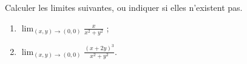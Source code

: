 \begin{exercice}[\boringexo]\label{exoLimiteContinue0002}

	Calculer les limites suivantes, ou indiquer si elles n'existent pas.
	\begin{enumerate}
		\item
			$\lim_{(x,y)\to (0,0)} \frac{x}{x^2+y^2}$   ;
		\item
			$\lim_{(x,y)\to (0,0)} \frac{(x+2y)^3}{x^2+y^2}$.
	\end{enumerate}

\end{exercice}
